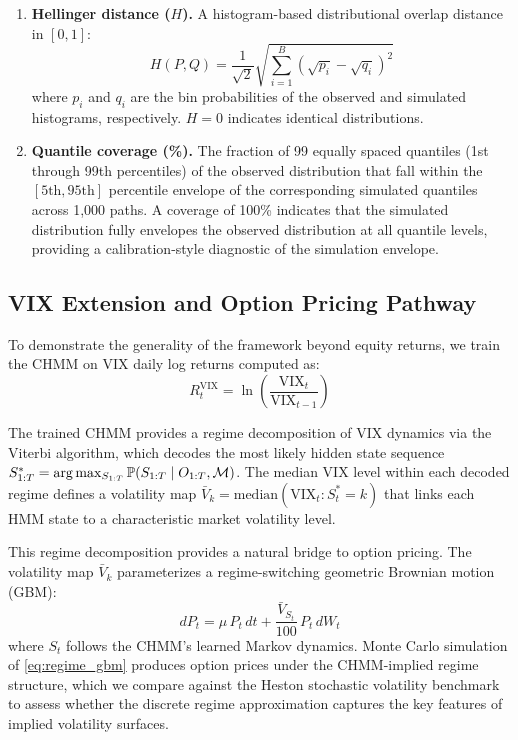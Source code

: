 \begin{enumerate}
    \item \textbf{Hellinger distance ($H$).}
    A histogram-based distributional overlap distance in $[0,1]$:
    \begin{equation}
        H(P, Q) = \frac{1}{\sqrt{2}} \sqrt{\sum_{i=1}^{B} \left(\sqrt{p_i} - \sqrt{q_i}\right)^2}
        \label{eq:hellinger}
    \end{equation}
    where $p_i$ and $q_i$ are the bin probabilities of the observed and simulated histograms, respectively.
    $H = 0$ indicates identical distributions.

    \item \textbf{Quantile coverage (\%).}
    The fraction of 99 equally spaced quantiles (1st through 99th percentiles) of the observed distribution that fall within the $[5\text{th}, 95\text{th}]$ percentile envelope of the corresponding simulated quantiles across 1,000 paths.
    A coverage of 100\% indicates that the simulated distribution fully envelopes the observed distribution at all quantile levels, providing a calibration-style diagnostic of the simulation envelope.
\end{enumerate}

\subsection{VIX Extension and Option Pricing Pathway}
\label{sec:vix_methods}

To demonstrate the generality of the framework beyond equity returns, we train the CHMM on VIX daily log returns computed as:
\begin{equation}
    R_t^{\text{VIX}} = \ln\!\left(\frac{\text{VIX}_t}{\text{VIX}_{t-1}}\right)
    \label{eq:vix_returns}
\end{equation}

The trained CHMM provides a regime decomposition of VIX dynamics via the Viterbi algorithm, which decodes the most likely hidden state sequence $S_{1:T}^{*} = \arg\max_{S_{1:T}} \mathbb{P}(S_{1:T} \mid O_{1:T}, \mathcal{M})$.
The median VIX level within each decoded regime defines a volatility map $\bar{V}_k = \text{median}(\text{VIX}_t : S_t^* = k)$ that links each HMM state to a characteristic market volatility level.

This regime decomposition provides a natural bridge to option pricing.
The volatility map $\bar{V}_k$ parameterizes a regime-switching geometric Brownian motion (GBM):
\begin{equation}
    dP_t = \mu\, P_t\, dt + \frac{\bar{V}_{S_t}}{100}\, P_t\, dW_t
    \label{eq:regime_gbm}
\end{equation}
where $S_t$ follows the CHMM's learned Markov dynamics.
Monte Carlo simulation of \eqref{eq:regime_gbm} produces option prices under the CHMM-implied regime structure, which we compare against the Heston stochastic volatility benchmark \citep{heston1993closed} to assess whether the discrete regime approximation captures the key features of implied volatility surfaces.
